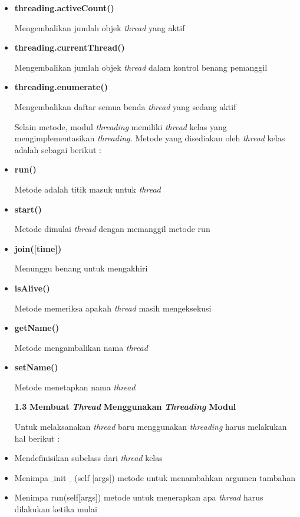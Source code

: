 \begin{itemize}
	\item \textbf{t}\textbf{hreading.activeCount() } \par
	Mengembalikan jumlah objek \textit{thread} yang aktif \par
	\item \textbf{t}\textbf{hreading.currentThread() } \par
	Mengembalikan jumlah objek \textit{thread} dalam kontrol benang pemanggil \par
	\item \textbf{t}\textbf{hreading.enumerate() } \par
	Mengembalikan daftar semua benda \textit{thread}\textit{ }yang sedang aktif \par
	\vspace{12pt}
	Selain metode, modul \textit{thread}\textit{ing }memiliki \textit{thread}\textit{ }kelas yang mengimplementasikan \textit{thread}\textit{ing. }Metode yang disediakan oleh \textit{thread}\textit{ }kelas adalah sebagai berikut : \par
	\item \textbf{run()} \par
	Metode adalah titik masuk untuk \textit{thread} \par
	\item \textbf{start()} \par
	Metode dimulai\textbf{ }\textit{thread}\textit{ }dengan memanggil metode run \par
	\item \textbf{join(}\textbf{[time]}\textbf{)} \par
	Menunggu benang untuk mengakhiri \par
	\item \textbf{isAlive()} \par
	Metode memeriksa apakah\textbf{ }\textit{thread}\textit{ }masih mengeksekusi\textbf{ } \par
	\item \textbf{getName()} \par
	Metode mengambalikan nama\textbf{ }\textit{thread} \par
	\item \textbf{setName()} \par
	Metode menetapkan nama\textbf{ }\textit{thread} \par
	\vspace{12pt}
	\textbf{1.3 }\textbf{Membuat }\textbf{\textit{Thread }}\textbf{Menggunakan }\textbf{\textit{Threading}}\textbf{ Modul} \par
	Untuk melaksanakan \textit{thread}\textit{ }baru menggunakan\textit{ threading} harus melakukan hal berikut : \par
	\item Mendefinisikan subclass dari \textit{thread} kelas \par
	\item Menimpa  $  \_  $init $  \_  $ (self [args]) metode untuk menambahkan argumen tambahan \par
	\item Menimpa run(self[args]) metode untuk menerapkan apa \textit{thread} harus dilakukan ketika mulai \end{itemize}
